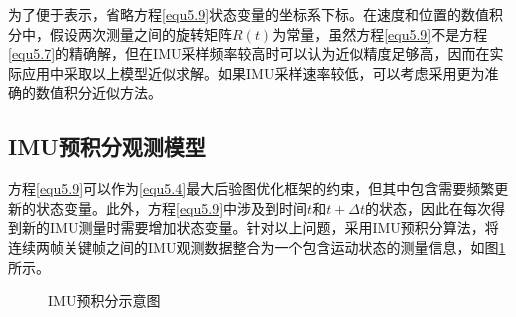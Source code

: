 为了便于表示，省略方程\eqref{equ5.9}状态变量的坐标系下标。在速度和位置的数值积分中，假设两次测量之间的旋转矩阵$R(t)$为常量，虽然方程\eqref{equ5.9}不是方程\eqref{equ5.7}的精确解，但在IMU采样频率较高时可以认为近似精度足够高，因而在实际应用中采取以上模型近似求解。如果IMU采样速率较低，可以考虑采用更为准确的数值积分近似方法。

\subsection{IMU预积分观测模型}
方程\eqref{equ5.9}可以作为\eqref{equ5.4}最大后验图优化框架的约束，但其中包含需要频繁更新的状态变量。此外，方程\eqref{equ5.9}中涉及到时间$t$和$t+\Delta t$的状态，因此在每次得到新的IMU测量时需要增加状态变量。针对以上问题，采用IMU预积分算法，将连续两帧关键帧之间的IMU观测数据整合为一个包含运动状态的测量信息，如图\ref{fig5.2}所示。
\begin{figure}
\centering
\caption{IMU预积分示意图}
\label{fig5.2}
\end{figure}

